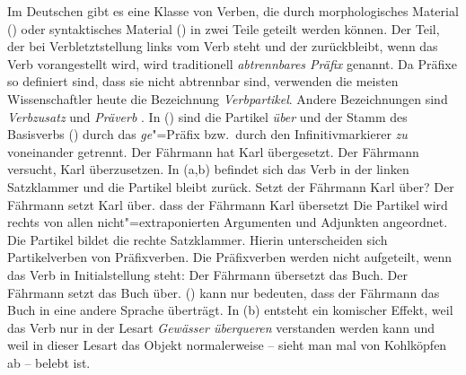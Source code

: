 Im Deutschen gibt es eine Klasse von Verben, die durch
morphologisches Material () oder syntaktisches
Material () in zwei Teile geteilt werden können. 
Der Teil, der bei Verbletztstellung links vom Verb steht und
der zurückbleibt, wenn das Verb vorangestellt wird, wird
traditionell \emph{abtrennbares Präfix} genannt. Da Präfixe
so definiert sind, dass sie nicht abtrennbar sind, verwenden
die meisten Wissenschaftler heute die Bezeichnung \emph{Verbpartikel}.
Andere Bezeichnungen sind \emph{Verbzusatz} und \emph{Präverb} \citep[]{Jung67a}.
In () sind die Partikel \emph{über} und der Stamm des Basisverbs ()
durch das \emph{ge}"=Präfix bzw.\ durch den Infinitivmarkierer \emph{zu} voneinander getrennt.
\eal
\ex{}
Der Fährmann hat Karl übergesetzt.
\ex
Der Fährmann versucht, Karl überzusetzen.
\zl
In (a,b) befindet sich das Verb in der linken Satzklammer und die Partikel bleibt zurück.
\eal
\ex
Setzt der Fährmann Karl über?
\ex
Der Fährmann setzt Karl über.
\label{ex-setzt-ueber}
\ex
dass der Fährmann Karl übersetzt
\zl
Die Partikel wird rechts von allen nicht"=extraponierten Argumenten und Adjunkten
angeordnet. Die Partikel bildet die rechte Satzklammer. Hierin unterscheiden sich Partikelverben
von Präfixverben. Die Präfixverben werden nicht aufgeteilt, wenn das Verb in Initialstellung
steht:
\eal
\ex Der Fährmann übersetzt das Buch.
\ex Der Fährmann setzt das Buch über.
\zl
() kann nur bedeuten, dass der Fährmann das Buch in eine andere Sprache überträgt.
In (b) entsteht ein komischer Effekt, weil das Verb nur in der Lesart \emph{Gewässer überqueren}
verstanden werden kann und weil in dieser Lesart das Objekt normalerweise -- sieht man mal von Kohlköpfen ab --
belebt ist.

